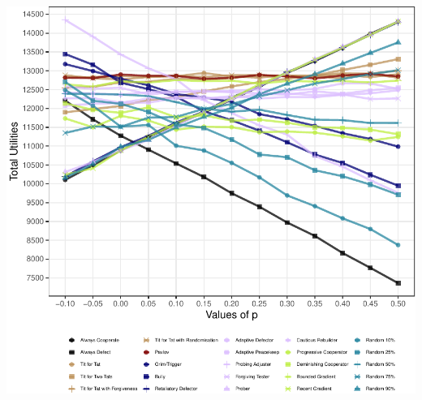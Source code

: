 \documentclass[11pt,preprint]{elsarticle}
\let\origfigure\figure
\let\endorigfigure\endfigure
\renewenvironment{figure}[1][2] {
    \expandafter\origfigure\expandafter[H]
} {
    \endorigfigure
}
\numberwithin{equation}{section}
\numberwithin{figure}{section}
\numberwithin{table}{section}
\begin{document}
\begin{figure}[H]

{\centering \includegraphics{Prisoners-Dilemma_files/figure-latex/unnamed-chunk-5-1} 

}

\caption{Strategies' Total Utilities for Different Strategies Accross p\label{pvalues}}\label{fig:unnamed-chunk-5}
\end{figure}
\end{document}
